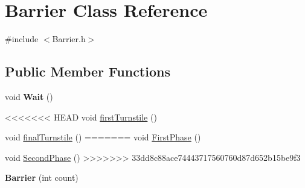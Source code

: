 \hypertarget{class_barrier}{}\section{Barrier Class Reference}
\label{class_barrier}


{\ttfamily \#include $<$Barrier.\+h$>$}

\subsection*{Public Member Functions}
\begin{DoxyCompactItemize}
\item 
void {\bfseries Wait} ()\hypertarget{class_barrier_a7de2afc6097b37c051d864bdf694c7e0}{}\label{class_barrier_a7de2afc6097b37c051d864bdf694c7e0}

\item 
<<<<<<< HEAD
void \hyperlink{class_barrier_a48006684f962b312bc0391629e08ca23}{first\+Turnstile} ()
\item 
void \hyperlink{class_barrier_af8ae6b2091ee7388d510fb7cb8ba2a1c}{final\+Turnstile} ()
=======
void \hyperlink{class_barrier_aa9fa4a2ce214b6a052ca9689fe4fa031}{First\+Phase} ()
\item 
void \hyperlink{class_barrier_ab2776cdecaf46b2c46e6a5ace63f30b4}{Second\+Phase} ()
>>>>>>> 33dd8c88ace74443717560760d87d652b15be9f3
\item 
{\bfseries Barrier} (int count)\hypertarget{class_barrier_a68730c862911d37696957056595aa604}{}\label{class_barrier_a68730c862911d37696957056595aa604}

\end{DoxyCompactItemize}
